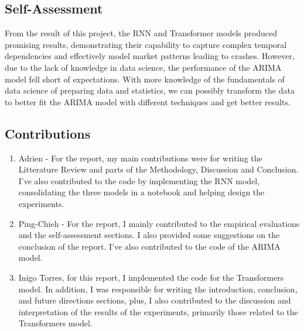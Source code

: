 \documentclass[12pt, letterpaper]{article}
\begin{document}
\subsection*{Self-Assessment}
From the result of this project, the RNN and Transformer models produced promising results, demonstrating their capability to capture complex temporal dependencies and effectively model market patterns leading to crashes. However, due to the lack of knowledge in data science, the performance of the ARIMA model fell short of expectations. With more knowledge of the fundamentals of data science of preparing data and statistics, we can possibly transform the data to better fit the ARIMA model with different techniques and get better results.

\pagebreak
\subsection*{Contributions}
\begin{enumerate}
    \item Adrien - 
        For the report, my main contributions were for writing the Litterature Review and parts of the Methodology, Discussion and Conclusion. I've also contributed to the code by implementing the RNN model, consolidating the three models in a notebook and helping design the experiments.
    \item Ping-Chieh - 
        For the report, I mainly contributed to the empirical evaluations and the self-assessment sections. I also provided some suggestions on the conclusion of the report. I've also contributed to the code of the ARIMA model.
    \item Inigo Torres, for this report, I implemented the code for the Transformers model. In addition, I was responsible for writing the introduction, conclusion, and future directions sections, plus, I also contributed to the discussion and interpretation of the results of the experiments, primarily those related to the Transformers model.
\end{enumerate}
\end{document}
